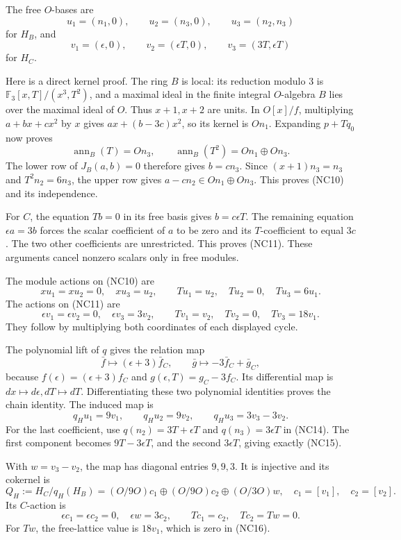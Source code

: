 \documentclass[
  10pt,
]{article}
\begin{document}
The free \(O\)-bases are \[
u_1=(n_1,0),\qquad u_2=(n_3,0),\qquad u_3=(n_2,n_3)
\tag{NC10}
\] for \(H_B\), and \[
v_1=(\epsilon,0),\qquad v_2=(\epsilon T,0),\qquad
v_3=(3T,\epsilon T)
\tag{NC11}
\] for \(H_C\).

Here is a direct kernel proof. The ring \(B\) is local: its reduction
modulo 3 is \(\mathbb F_3[x,T]/(x^3,T^2)\), and a maximal ideal in the
finite integral \(O\)-algebra \(B\) lies over the maximal ideal of
\(O\). Thus \(x+1,x+2\) are units. In \(O[x]/f\), multiplying
\(a+bx+cx^2\) by \(x\) gives \(ax+(b-3c)x^2\), so its kernel is
\(On_1\). Expanding \(p+Tq_0\) now proves \[
\operatorname{ann}_B(T)=On_3,\qquad
\operatorname{ann}_B(T^2)=On_1\oplus On_3.
\] The lower row of \(J_B(a,b)=0\) therefore gives \(b=cn_3\). Since
\((x+1)n_3=n_3\) and \(T^2n_2=6n_3\), the upper row gives
\(a-cn_2\in On_1\oplus On_3\). This proves (NC10) and its independence.

For \(C\), the equation \(Tb=0\) in its free basis gives
\(b=c\epsilon T\). The remaining equation \(\epsilon a=3b\) forces the
scalar coefficient of \(a\) to be zero and its \(T\)-coefficient to
equal \(3c\). The two other coefficients are unrestricted. This proves
(NC11). These arguments cancel nonzero scalars only in free modules.

The module actions on (NC10) are \[
xu_1=xu_2=0,\quad xu_3=u_2,\qquad
Tu_1=u_2,\quad Tu_2=0,\quad Tu_3=6u_1.
\tag{NC12}
\] The actions on (NC11) are \[
\epsilon v_1=\epsilon v_2=0,\quad\epsilon v_3=3v_2,\qquad
Tv_1=v_2,\quad Tv_2=0,\quad Tv_3=18v_1.
\tag{NC13}
\] They follow by multiplying both coordinates of each displayed cycle.

The polynomial lift of \(q\) gives the relation map \[
\bar f\longmapsto(\epsilon+3)\bar f_C,\qquad
\bar g\longmapsto-3\bar f_C+\bar g_C,
\tag{NC14}
\] because \(f(\epsilon)=(\epsilon+3)f_C\) and
\(g(\epsilon,T)=g_C-3f_C\). Its differential map is
\(dx\mapsto d\epsilon,dT\mapsto dT\). Differentiating these two
polynomial identities proves the chain identity. The induced map is \[
q_Hu_1=9v_1,\qquad q_Hu_2=9v_2,\qquad
q_Hu_3=3v_3-3v_2.
\tag{NC15}
\] For the last coefficient, use \(q(n_2)=3T+\epsilon T\) and
\(q(n_3)=3\epsilon T\) in (NC14). The first component becomes
\(9T-3\epsilon T\), and the second \(3\epsilon T\), giving exactly
(NC15).

With \(w=v_3-v_2\), the map has diagonal entries \(9,9,3\). It is
injective and its cokernel is \[
Q_H:=H_C/q_H(H_B)
=(O/9O)c_1\oplus(O/9O)c_2\oplus(O/3O)w,
\quad c_1=[v_1],\quad c_2=[v_2].
\tag{NC16}
\] Its \(C\)-action is \[
\epsilon c_1=\epsilon c_2=0,\quad\epsilon w=3c_2,\qquad
Tc_1=c_2,\quad Tc_2=Tw=0.
\tag{NC17}
\] For \(Tw\), the free-lattice value is \(18v_1\), which is zero in
(NC16).
\end{document}
